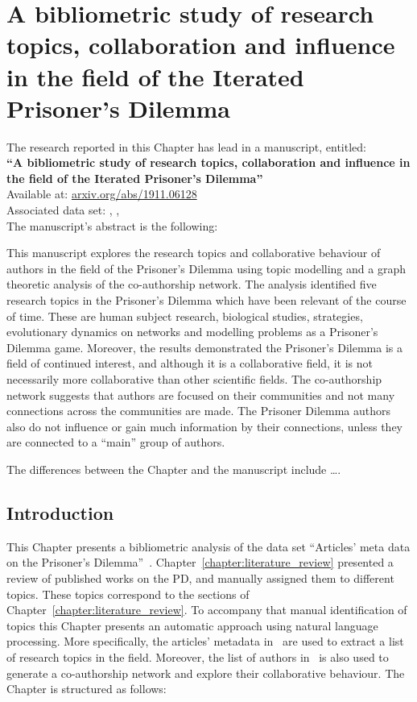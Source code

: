 \chapter{A bibliometric study of research topics, collaboration and influence in
the field of the Iterated Prisoner's Dilemma}\label{chapter:bibliometric_study}

\begin{center}
    The research reported in this Chapter has lead in a manuscript, entitled: \\
    \textbf{``A bibliometric study of research topics, collaboration and influence in the field of the Iterated Prisoner's Dilemma''} \\
    Available at: \url{arxiv.org/abs/1911.06128} \\
    Associated data set: \cite{auction_data_2018}, \cite{anarchy_data_2018}, \cite{pd_data_2018}\\ \vspace{.5cm}
    The manuscript's abstract is the following:
\end{center}

This manuscript explores the research topics and collaborative behaviour of
authors in the field of the Prisoner's Dilemma using topic modelling and a graph
theoretic analysis of the co-authorship network. The analysis identified five
research topics in the Prisoner's Dilemma which have been relevant of the course
of time. These are human subject research, biological studies, strategies,
evolutionary dynamics on networks and modelling problems as a Prisoner's Dilemma
game. Moreover, the results demonstrated the Prisoner's Dilemma is a field of
continued interest, and although it is a collaborative field, it is not
necessarily more collaborative than other scientific fields. The co-authorship
network suggests that authors are focused on their communities and not many
connections across the communities are made. The Prisoner Dilemma authors also
do not influence or gain much information by their connections, unless they are
connected to a ``main'' group of authors.

The differences between the Chapter and the manuscript include \dots.
\newpage

\section{Introduction}\label{section:introduction}

This Chapter presents a bibliometric analysis of the data set
``Articles' meta data on the Prisoner's Dilemma''~\cite{pd_data_2018}.
Chapter~\ref{chapter:literature_review} presented a review of published works on
the PD, and manually assigned them to different topics. These topics correspond
to the sections of Chapter~\ref{chapter:literature_review}. To accompany that
manual identification of topics this Chapter presents an automatic approach
using natural language processing. More specifically, the \totalarticles articles' metadata
in~\cite{pd_data_2018} are used to extract a list of research topics in the field.
Moreover, the list of authors in~\cite{pd_data_2018} is also used to generate a
co-authorship network and explore their collaborative behaviour.
The Chapter is structured as follows:

